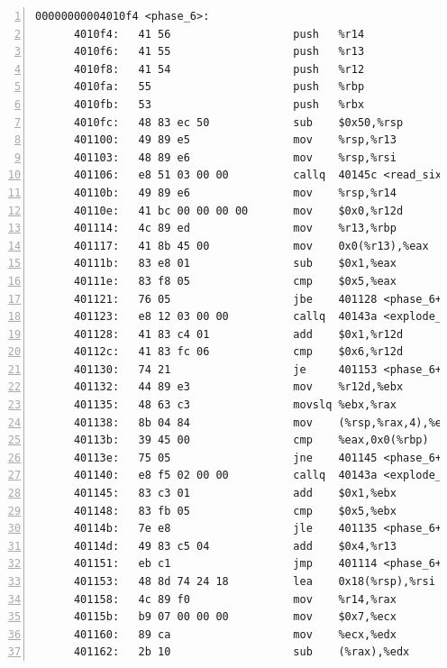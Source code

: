 \documentclass{article}
\begin{document}
\begin{lstlisting}[title = bomb的反汇编代码及部分注释, xleftmargin = 2em,xrightmargin = 2em, aboveskip = 1em, numbers = left, basicstyle=\scriptsize\ttfamily, numberstyle=\scriptsize]
    00000000004010f4 <phase_6>:
      4010f4:	41 56                	push   %r14
      4010f6:	41 55                	push   %r13
      4010f8:	41 54                	push   %r12
      4010fa:	55                   	push   %rbp
      4010fb:	53                   	push   %rbx
      4010fc:	48 83 ec 50          	sub    $0x50,%rsp					; %rsp -= 0x50;
      401100:	49 89 e5             	mov    %rsp,%r13					; %r13 = %rsp; 
      401103:	48 89 e6             	mov    %rsp,%rsi					; %rsi = %rsp;
      401106:	e8 51 03 00 00       	callq  40145c <read_six_numbers>	; read_six_numbers(...);
      40110b:	49 89 e6             	mov    %rsp,%r14					; %r14 = %rsp;
      40110e:	41 bc 00 00 00 00    	mov    $0x0,%r12d					; %r12d = 0;
      401114:	4c 89 ed             	mov    %r13,%rbp					; %rbp = %r13;
      401117:	41 8b 45 00          	mov    0x0(%r13),%eax				; %eax = M[%r13];
      40111b:	83 e8 01             	sub    $0x1,%eax					; %eax--;
      40111e:	83 f8 05             	cmp    $0x5,%eax					; if (%eax <= 5)
      401121:	76 05                	jbe    401128 <phase_6+0x34>		;	  goto #529;
      401123:	e8 12 03 00 00       	callq  40143a <explode_bomb>		; explode_bomb(...);
      401128:	41 83 c4 01          	add    $0x1,%r12d					; %r12d++;
      40112c:	41 83 fc 06          	cmp    $0x6,%r12d					; if (%r12d == 6)
      401130:	74 21                	je     401153 <phase_6+0x5f>		;	  goto #543;
      401132:	44 89 e3             	mov    %r12d,%ebx					; %ebx = %r12d;
      401135:	48 63 c3             	movslq %ebx,%rax					; %rax = %ebx;
      401138:	8b 04 84             	mov    (%rsp,%rax,4),%eax			; %eax = M[%rsp + %eax * 4];
      40113b:	39 45 00             	cmp    %eax,0x0(%rbp)				; if (M[%rbp] != %eax)
      40113e:	75 05                	jne    401145 <phase_6+0x51>		;	  goto #538;
      401140:	e8 f5 02 00 00       	callq  40143a <explode_bomb>		; explode_bomb(...);
      401145:	83 c3 01             	add    $0x1,%ebx					; %ebx++;
      401148:	83 fb 05             	cmp    $0x5,%ebx					; if (%ebx <= 5)
      40114b:	7e e8                	jle    401135 <phase_6+0x41>		;	  goto #533;
      40114d:	49 83 c5 04          	add    $0x4,%r13					; %r13 += 4;
      401151:	eb c1                	jmp    401114 <phase_6+0x20>		; goto #523;
      401153:	48 8d 74 24 18       	lea    0x18(%rsp),%rsi				; %rsi = %rsp + 0x18;
      401158:	4c 89 f0             	mov    %r14,%rax					; %rax = %r14;
      40115b:	b9 07 00 00 00       	mov    $0x7,%ecx					; %ecx = 0x7;
      401160:	89 ca                	mov    %ecx,%edx					; %edx = %ecx;
      401162:	2b 10                	sub    (%rax),%edx					; %edx -= M[%rax];

\end{lstlisting}
\end{document}
